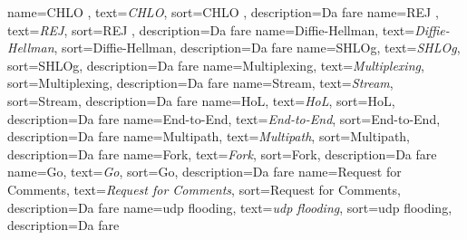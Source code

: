  {
    name=CHLO ,
    text=\emph{CHLO},
    sort=CHLO ,
    description={Da fare}
}
 {
    name=REJ ,
    text=\emph{REJ},
    sort=REJ ,
    description={Da fare}
}
 {
    name=Diffie-Hellman,
    text=\emph{Diffie-Hellman},
    sort=Diffie-Hellman,
    description={Da fare}
}
 {
    name=SHLOg,
    text=\emph{SHLOg},
    sort=SHLOg,
    description={Da fare}
}
 {
    name=Multiplexing,
    text=\emph{Multiplexing},
    sort=Multiplexing,
    description={Da fare}
}
 {
    name=Stream,
    text=\emph{Stream},
    sort=Stream,
    description={Da fare}
}
 {
    name=HoL,
    text=\emph{HoL},
    sort=HoL,
    description={Da fare}
}
 {
    name=End-to-End,
    text=\emph{End-to-End},
    sort=End-to-End,
    description={Da fare}
}
 {
    name=Multipath,
    text=\emph{Multipath},
    sort=Multipath,
    description={Da fare}
}
 {
    name=Fork,
    text=\emph{Fork},
    sort=Fork,
    description={Da fare}
}
 {
    name=Go,
    text=\emph{Go},
    sort=Go,
    description={Da fare}
}
 {
    name=Request for Comments,
    text=\emph{Request for Comments},
    sort=Request for Comments,
    description={Da fare}
}
 {
    name=udp flooding,
    text=\emph{udp flooding},
    sort=udp flooding,
    description={Da fare}
}